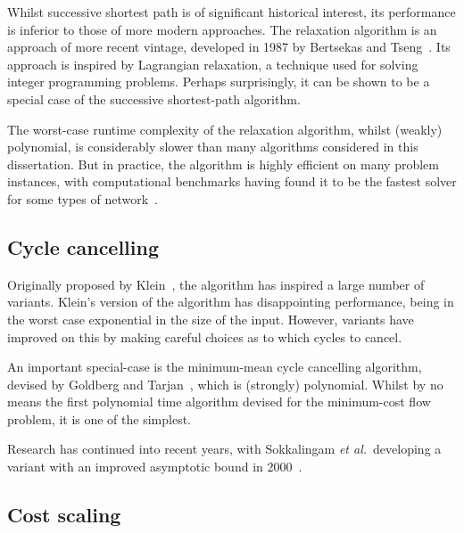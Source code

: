 
Whilst successive shortest path is of significant historical interest, its performance is inferior to those of more modern approaches. The relaxation algorithm is an approach of more recent vintage, developed in 1987 by Bertsekas and Tseng~\cite{BertsekasMethod:1988,BertsekasCodes:1988,BertsekasTseng:94}. Its approach is inspired by Lagrangian relaxation, a technique used for solving integer programming problems. Perhaps surprisingly, it can be shown to be a special case of the successive shortest-path algorithm.

The worst-case runtime complexity of the relaxation algorithm, whilst (weakly) polynomial, is considerably slower than many algorithms considered in this dissertation. But in practice, the algorithm is highly efficient on many problem instances, with computational benchmarks having found it to be the fastest solver for some types of network~\cite{KiralyKovacs:2012}.

\subsection{Cycle cancelling}

Originally proposed by Klein~\cite{Klein:1967}, the algorithm has inspired a large number of variants. Klein's version of the algorithm has disappointing performance, being in the worst case exponential in the size of the input. However, variants have improved on this by making careful choices as to which cycles to cancel.

An important special-case is the minimum-mean cycle cancelling algorithm, devised by Goldberg and Tarjan~\cite{Goldberg:1989}, which is (strongly) polynomial. Whilst by no means the first polynomial time algorithm devised for the minimum-cost flow problem, it is one of the simplest.

Research has continued into recent years, with Sokkalingam \textit{et al.}\ developing a variant with an improved asymptotic bound in 2000~\cite{Sokkalingam:2000}.

\subsection{Cost scaling}

